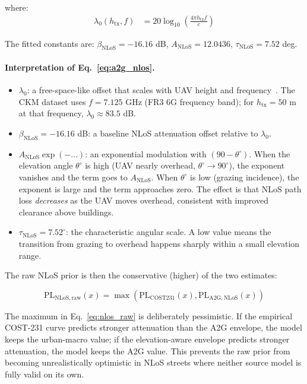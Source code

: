 where:
\begin{align}
\lambda_0(h_{\mathrm{tx}}, f)
&= 20\log_{10}\!\left(\frac{4\pi h_{\mathrm{tx}} f}{c}\right)
\label{eq:lambda0}
\end{align}

The fitted constants are:
$\beta_{\mathrm{NLoS}} = -16.16$ dB,
$A_{\mathrm{NLoS}} = 12.0436$,
$\tau_{\mathrm{NLoS}} = 7.52$ deg.

\paragraph{Interpretation of Eq.~\eqref{eq:a2g_nlos}.}
\begin{itemize}
\item $\lambda_0$: a free-space-like offset that scales with UAV height and
      frequency~\cite{khawaja_survey,wocc2021}. The CKM dataset uses
      $f = 7.125$ GHz (FR3 6G frequency band); for
      $h_{\mathrm{tx}} = 50$ m at that frequency, $\lambda_0 \approx 83.5$ dB.
\item $\beta_{\mathrm{NLoS}} = -16.16$ dB: a baseline NLoS attenuation
      offset relative to $\lambda_0$.
\item $A_{\mathrm{NLoS}}\exp(-\ldots)$: an exponential modulation with
      $(90 - \theta^\circ)$. When the elevation angle $\theta^\circ$ is high
      (UAV nearly overhead, $\theta^\circ \to 90^\circ$), the exponent
      vanishes and the term goes to $A_{\mathrm{NLoS}}$. When $\theta^\circ$
      is low (grazing incidence), the exponent is large and the term
      approaches zero. The effect is that NLoS path loss \emph{decreases} as
      the UAV moves overhead, consistent with improved clearance above
      buildings.
\item $\tau_{\mathrm{NLoS}} = 7.52^\circ$: the characteristic angular scale.
      A low value means the transition from grazing to overhead happens
      sharply within a small elevation range.
\end{itemize}

The raw NLoS prior is then the conservative (higher) of the two estimates:

\begin{equation}
\mathrm{PL}_{\mathrm{NLoS,raw}}(x)
=
\max\left(
\mathrm{PL}_{\mathrm{COST231}}(x),
\mathrm{PL}_{\mathrm{A2G,NLoS}}(x)
\right)
\label{eq:nlos_raw}
\end{equation}

The maximum in Eq.~\eqref{eq:nlos_raw} is deliberately pessimistic. If the
empirical COST-231 curve predicts stronger attenuation than the A2G envelope,
the model keeps the urban-macro value; if the elevation-aware envelope predicts
stronger attenuation, the model keeps the A2G value. This prevents the raw
prior from becoming unrealistically optimistic in NLoS streets where neither
source model is fully valid on its own.


